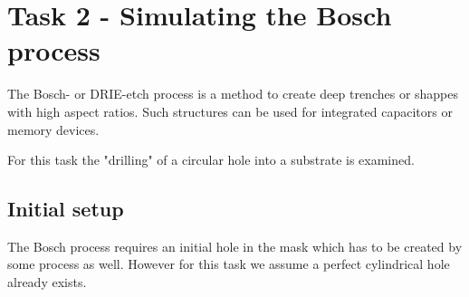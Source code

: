 \section{Task 2 - Simulating the Bosch process}
The Bosch- or DRIE-etch process is a method to create deep trenches or shappes
with high aspect ratios. Such structures can be used for integrated capacitors or memory devices.

For this task the "drilling" of a circular hole into a substrate is examined.

\subsection{Initial setup}
The Bosch process requires an initial hole in the mask which has to be created by some process as well.
However for this task we assume a perfect cylindrical hole already exists.

